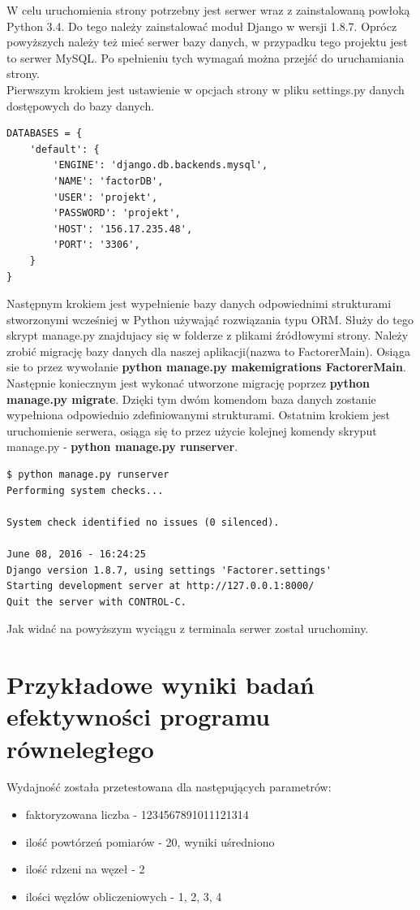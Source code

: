 \documentclass{article}
\begin{document}
W celu uruchomienia strony potrzebny jest serwer wraz z zainstalowaną powłoką Python 3.4. Do tego należy zainstalować moduł Django w wersji 1.8.7. Oprócz powyższych należy też mieć serwer bazy danych, w przypadku tego projektu jest to serwer MySQL. Po spełnieniu tych wymagań można przejść do uruchamiania strony.\\

Pierwszym krokiem jest ustawienie w opcjach strony w pliku settings.py danych dostępowych do bazy danych.
\begin{lstlisting}
DATABASES = {
    'default': {
        'ENGINE': 'django.db.backends.mysql',
        'NAME': 'factorDB',
        'USER': 'projekt',
        'PASSWORD': 'projekt',
        'HOST': '156.17.235.48',
        'PORT': '3306',
    }
}
\end{lstlisting}

Następnym krokiem jest wypełnienie bazy danych odpowiednimi strukturami stworzonymi wcześniej w Python używająć rozwiązania typu ORM. Służy do tego skrypt manage.py znajdujacy się w folderze z plikami źródłowymi strony. Należy zrobić migrację bazy danych dla naszej aplikacji(nazwa to FactorerMain). Osiąga sie to przez wywołanie \textbf{python manage.py makemigrations FactorerMain}. Następnie koniecznym jest wykonać utworzone migrację poprzez \textbf{python manage.py migrate}. Dzięki tym dwóm komendom baza danych zostanie wypełniona odpowiednio zdefiniowanymi strukturami. Ostatnim krokiem jest uruchomienie serwera, osiąga się to przez użycie kolejnej komendy skryput manage.py - \textbf{python manage.py runserver}.
\begin{lstlisting}
$ python manage.py runserver
Performing system checks...

System check identified no issues (0 silenced).

June 08, 2016 - 16:24:25
Django version 1.8.7, using settings 'Factorer.settings'
Starting development server at http://127.0.0.1:8000/
Quit the server with CONTROL-C.

\end{lstlisting}

Jak widać na powyższym wyciągu z terminala serwer został uruchominy.

\newpage
\section{Przykładowe wyniki badań efektywności programu równeległego}

Wydajność została przetestowana dla następujących parametrów:
\begin{itemize}
\item faktoryzowana liczba - 1234567891011121314
\item ilość powtórzeń pomiarów - 20, wyniki uśredniono
\item ilość rdzeni na węzeł - 2
\item ilości węzłów obliczeniowych - 1, 2, 3, 4
\end{itemize}
\end{document}
